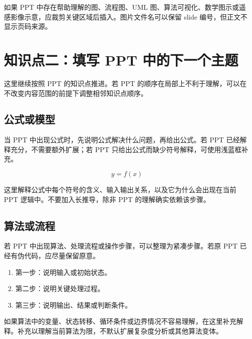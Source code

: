 \documentclass[UTF8,zihao=-4]{ctexart}
\begin{document}
如果 PPT 中存在帮助理解的图、流程图、UML 图、算法可视化、数学图示或遥感影像示意，应裁剪关键区域后插入。图片文件名可以保留 slide 编号，但正文不显示页码来源。


\section{知识点二：填写 PPT 中的下一个主题}

这里继续按照 PPT 的知识点推进。若 PPT 的顺序在局部上不利于理解，可以在不改变内容范围的前提下调整相邻知识点顺序。

\subsection{公式或模型}

当 PPT 中出现公式时，先说明公式解决什么问题，再给出公式。若 PPT 已经解释充分，不需要额外扩展；若 PPT 只给出公式而缺少符号解释，可使用浅蓝框补充。

\[
  y = f(x)
\]

\begin{aiexplainbox}[符号说明]
这里解释公式中每个符号的含义、输入输出关系，以及它为什么会出现在当前 PPT 逻辑中。不要加入长推导，除非 PPT 的理解确实依赖该步骤。
\end{aiexplainbox}

\subsection{算法或流程}

若 PPT 中出现算法、处理流程或操作步骤，可以整理为紧凑步骤。若原 PPT 已经有伪代码，应尽量保留原意。

\begin{enumerate}
  \item 第一步：说明输入或初始状态。
  \item 第二步：说明关键处理过程。
  \item 第三步：说明输出、结果或判断条件。
\end{enumerate}

\begin{aiexplainbox}[关键变量解释]
如果算法中的变量、状态转移、循环条件或边界情况不容易理解，在这里补充解释。补充以理解当前算法为限，不默认扩展复杂度分析或其他算法变体。
\end{aiexplainbox}
\end{document}
